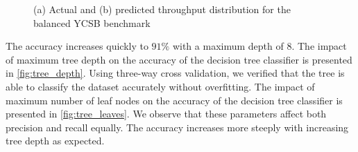 \begin{figure}
\centering
{}

\caption{(a) Actual and (b) predicted throughput distribution for the
  balanced YCSB benchmark}
\label{fig:throughput_ycsb_balanced}
\end{figure}


The accuracy increases quickly to $91\%$ with a maximum depth of $8$. The impact
of maximum tree depth on the accuracy of the decision tree classifier
is presented in \cref{fig:tree_depth}. Using three-way cross validation,
we verified that the tree is able to classify the dataset accurately 
without overfitting. 
The impact of maximum number of leaf nodes on the accuracy of the 
decision tree classifier is presented in \cref{fig:tree_leaves}.
We observe that these parameters affect both precision and recall
equally. The accuracy increases more steeply with increasing tree
depth as expected.

